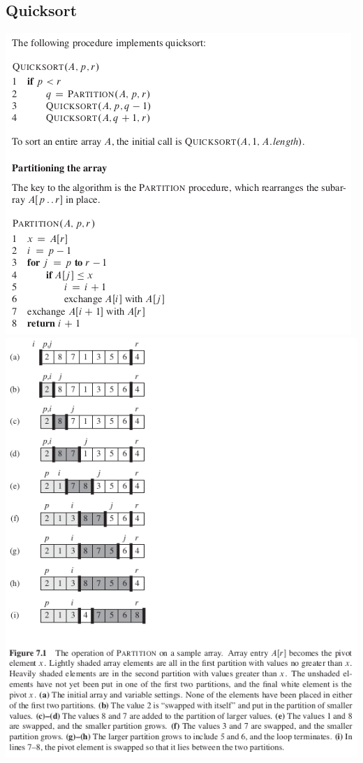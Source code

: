\documentclass[11pt]{article}
\begin{document}
\subsection{Quicksort}
\label{sec-3-2}
\includegraphics[width=.9\linewidth]{pics/c7_quicksort.png} \\

\includegraphics[width=.9\linewidth]{pics/c7_quicksort_fig.png} \\
\end{document}
